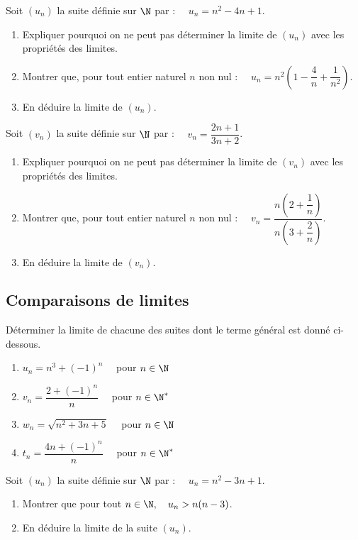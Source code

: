 \documentclass[a4paper,11pt,exos]{nsi} %
\begin{document}
\exo{}
Soit $(u_n)$ la suite définie sur $\N$ par : $\quad u_n=n^2-4n+1$.
\begin{enumerate}
    \item Expliquer pourquoi on ne peut pas déterminer la limite de $(u_n)$ avec les propriétés des limites.
    \item Montrer que, pour tout entier naturel $n$ non nul : $\quad u_n=n^2 \left(1-\dfrac{4}{n}+\dfrac{1}{n^2}\right)$.
    \item En déduire la limite de $(u_n)$.
\end{enumerate}

\exo{}
Soit $(v_n)$ la suite définie sur $\N$ par : $\quad v_n=\dfrac{2n+1}{3n+2}$.
\begin{enumerate}
    \item Expliquer pourquoi on ne peut pas déterminer la limite de $(v_n)$ avec les propriétés des limites.
    \item Montrer que, pour tout entier naturel $n$ non nul : $\quad v_n=\dfrac{n\left(2+\dfrac{1}{n}\right)}{n\left(3+\dfrac{2}{n}\right)}$.
    \item En déduire la limite de $(v_n)$.
\end{enumerate}

\subsection*{Comparaisons de limites}

\exo{}
Déterminer la limite de chacune des suites dont le terme général est donné ci-dessous.
\begin{multicols}{2}
    \begin{enumerate}
        \item $u_n=n^3+(-1)^n\quad$ pour $n\in\N$
        \item $v_n=\dfrac{2+(-1)^n}{n}\quad$ pour $n\in\N^*$
        \item $w_n=\sqrt{n^2+3n+5}\quad$ pour $n\in\N$
        \item $t_n=\dfrac{4n+(-1)^n}{n}\quad$ pour $n\in\N^*$
    \end{enumerate}
\end{multicols}

\exo{}
Soit $(u_n)$ la suite définie sur $\N$ par : $\quad u_n=n^2-3n+1$.
\begin{enumerate}
    \item Montrer que pour tout $n\in\N, \quad u_n>n(n-3)$.
    \item En déduire la limite de la suite $(u_n)$.
\end{enumerate}
\end{document}
